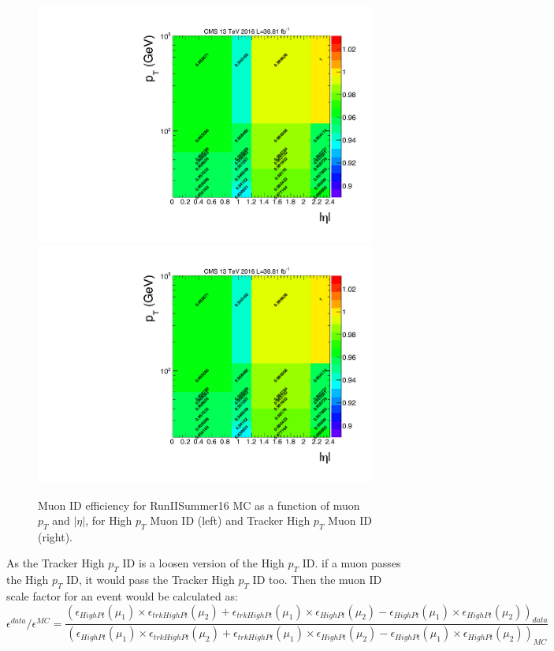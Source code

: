 \begin{figure}[htbp]
\begin{center}
\includegraphics[width=0.49\linewidth, page=5]{figures/bg_muonidisoeff.pdf}
\includegraphics[width=0.49\linewidth, page=6]{figures/bg_muonidisoeff.pdf}
\caption{Muon ID efficiency for RunIISummer16 MC as a function of muon $p_T$ and $|\eta|$, for High $p_T$ Muon ID (left) and Tracker High $p_T$ Muon ID (right).}
\label{fig:bg_muonmcideff}
\end{center}
\end{figure}

As the Tracker High $p_T$ ID is a loosen version of the High $p_T$ ID. if a muon passes the High $p_T$ ID, it would pass the Tracker High $p_T$ ID too. Then the muon ID scale factor for an event would be calculated as:
\begin{equation}
\epsilon^{data}/\epsilon^{MC} =\frac{(\epsilon_{HighPt}(\mu_1)\times \epsilon_{trkHighPt}(\mu_2)+\epsilon_{trkHighPt}(\mu_1)\times \epsilon_{HighPt}(\mu_2)-\epsilon_{HighPt}(\mu_1)\times \epsilon_{HighPt}(\mu_2))_{data}}{(\epsilon_{HighPt}(\mu_1)\times \epsilon_{trkHighPt}(\mu_2)+\epsilon_{trkHighPt}(\mu_1)\times \epsilon_{HighPt}(\mu_2)-\epsilon_{HighPt}(\mu_1)\times \epsilon_{HighPt}(\mu_2))_{MC}}
\end{equation}

